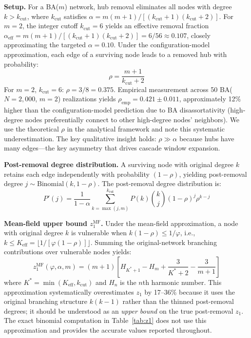 \documentclass[aps,pre,twocolumn,superscriptaddress,showpacs]{revtex4-2}
\newcommand{\kcut}{k_{\text{cut}}}
\newcommand{\keff}{K_{\text{eff}}}
\begin{document}
\textbf{Setup.} For a BA($m$) network, hub removal eliminates all nodes with degree $k > \kcut$, where $\kcut$ satisfies $\alpha = m(m+1)/[(\kcut+1)(\kcut+2)]$. For $m=2$, the integer cutoff $\kcut = 6$ yields an effective removal fraction $\alpha_{\mathrm{eff}} = m(m+1)/[(\kcut+1)(\kcut+2)] = 6/56 \approx 0.107$, closely approximating the targeted $\alpha = 0.10$. Under the configuration-model approximation, each edge of a surviving node leads to a removed hub with probability:
\begin{equation}
\rho = \frac{m+1}{\kcut + 2}
\label{eq:rho}
\end{equation}
For $m=2$, $\kcut=6$: $\rho = 3/8 = 0.375$. Empirical measurement across 50 BA($N=2{,}000$, $m=2$) realizations yields $\rho_{\mathrm{emp}} = 0.421 \pm 0.011$, approximately 12\% higher than the configuration-model prediction due to BA disassortativity (high-degree nodes preferentially connect to other high-degree nodes' neighbors). We use the theoretical $\rho$ in the analytical framework and note this systematic underestimation. The key qualitative insight holds: $\rho \gg \alpha$ because hubs have many edges---the key asymmetry that drives cascade window expansion.

\textbf{Post-removal degree distribution.} A surviving node with original degree $k$ retains each edge independently with probability $(1-\rho)$, yielding post-removal degree $j \sim \mathrm{Binomial}(k, 1-\rho)$. The post-removal degree distribution is:
\begin{equation}
P'(j) = \frac{1}{1-\alpha} \sum_{k=\max(j,m)}^{\kcut} P(k) \binom{k}{j} (1-\rho)^j \rho^{k-j}
\label{eq:pprime}
\end{equation}

\textbf{Mean-field upper bound $z_1^{\mathrm{MF}}$.} Under the mean-field approximation, a node with original degree $k$ is vulnerable when $k(1-\rho) \leq 1/\varphi$, i.e., $k \leq \keff = \lfloor 1/[\varphi(1-\rho)] \rfloor$. Summing the original-network branching contributions over vulnerable nodes yields:
\begin{equation}
z_1^{\mathrm{MF}}(\varphi, \alpha, m) = (m+1) \left[ H_{K^*+1} - H_m + \frac{3}{K^*+2} - \frac{3}{m+1} \right]
\label{eq:z1mf}
\end{equation}
where $K^* = \min(\keff, \kcut)$ and $H_n$ is the $n$th harmonic number. This approximation systematically overestimates $z_1$ by 17--36\% because it uses the original branching structure $k(k-1)$ rather than the thinned post-removal degrees; it should be understood as an \emph{upper bound} on the true post-removal $z_1$. The exact binomial computation in Table~\ref{tab:z1} does not use this approximation and provides the accurate values reported throughout.
\end{document}
